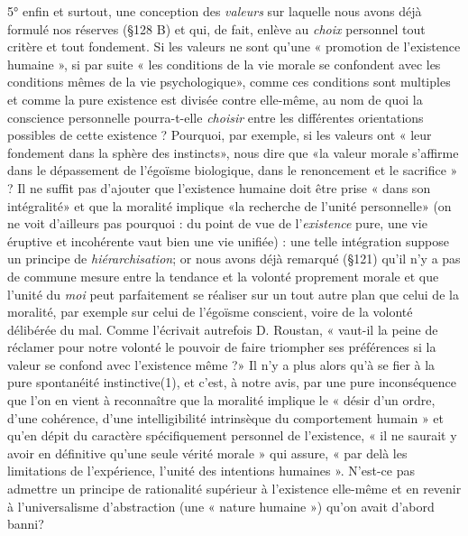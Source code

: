 5° enfin et surtout, une conception des {\it valeurs} sur laquelle nous
avons déjà formulé nos réserves (\S 128 B) et qui, de fait, enlève au
{\it choix} personnel tout critère et tout fondement. Si les valeurs ne sont
qu’une « promotion de l’existence humaine », si par suite « les conditions
de la vie morale se confondent avec les conditions mêmes de la
vie psychologique», comme ces conditions sont multiples et comme la
pure existence est divisée contre elle-même, au nom de quoi la conscience
personnelle pourra-t-elle {\it choisir} entre les différentes orientations
possibles de cette existence ? Pourquoi, par exemple, si les valeurs
ont « leur fondement dans la sphère des instincts», nous dire que «la
valeur morale s'affirme dans le dépassement de l’égoïsme biologique,
dans le renoncement et le sacrifice » ? Il ne suffit pas d’ajouter que
l'existence humaine doit être prise « dans son intégralité» et que la
moralité implique «la recherche de l’unité personnelle» (on ne voit
d’ailleurs pas pourquoi : du point de vue de l'{\it existence} pure, une vie
éruptive et incohérente vaut bien une vie unifiée) : une telle intégration
suppose un principe de {\it hiérarchisation}; or nous avons déjà
remarqué (\S 121) qu’il n’y a pas de commune mesure entre la tendance
et la volonté proprement morale et que l’unité du {\it moi} peut parfaitement
se réaliser sur un tout autre plan que celui de la moralité, par
exemple sur celui de l’égoïsme conscient, voire de la volonté délibérée
du mal. Comme l’écrivait autrefois D. Roustan, « vaut-il la peine de
réclamer pour notre volonté le pouvoir de faire triompher ses préférences
si la valeur se confond avec l’existence même ?» Il n’y a plus
alors qu’à se fier à la pure spontanéité instinctive(1), et c’est, à notre
avis, par une pure inconséquence que l’on en vient à reconnaître que
la moralité implique le « désir d’un ordre, d’une cohérence, d’une
intelligibilité intrinsèque du comportement humain » et qu’en dépit
du caractère spécifiquement personnel de l'existence, « il ne saurait
y avoir en définitive qu’une seule vérité morale » qui assure, « par
delà les limitations de l'expérience, l’unité des intentions humaines ».
N'est-ce pas admettre un principe de rationalité supérieur à l’existence
elle-même et en revenir à l’universalisme d’abstraction (une
« nature humaine ») qu’on avait d’abord banni?

